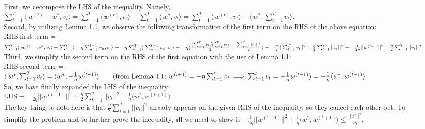 \documentclass[11pt,english]{article}
\begin{document}
	First, we decompose the LHS of the inequality. Namely, $\sum_{t=1}^{T} \langle\ w^{(t)} - w^*, v_t\rangle = \sum_{t=1}^{T} \langle\,w^{(t)}, v_t\rangle - \sum_{t=1}^{T} \langle\,w^*, v_t\rangle = \sum_{t=1}^{T} \langle\,w^{(t)}, v_t\rangle - \langle\,w^*, \sum_{t=1}^{T} v_t\rangle$.\\
	
	Second, by utilizing Lemma 1.1, we observe the following transformation of the first term on the RHS of the above equation:\\
	RHS first term = $\sum_{t=1}^{T} \langle\ w^{(t)} - w^*, v_t\rangle \\
	= \sum_{t=1}^{T} \langle\ -\eta \sum_{u=1}^{t-1} v_u, v_t\rangle \\
	= -\eta \sum_{t=1}^{T} \langle\ \sum_{u=1}^{t-1} v_u, v_t\rangle \\
	= -\eta (\frac{\langle \sum_{t=1}^{T} v_t, \sum_{t=1}^{T} v_t\rangle}{2} - \frac{\sum_{t=1}^{T} ||v_t||^2}{2})\\
	= -\frac{\eta}{2} ||\sum_{t=1}^{T} v_t||^2 + \frac{\eta}{2} \sum_{t=1}^{T} ||v_t||^2\\
	= -\frac{1}{2\eta} ||w^{(t+1)}||^2 + \frac{\eta}{2} \sum_{t=1}^{T} ||v_t||^2$\\

	Third, we simplify the second term on the RHS of the first equation with the use of Lemma 1.1:\\
	RHS second term = $\langle\,w^*, \sum_{t=1}^{T} v_t\rangle \\
	= \langle w^*, -\frac{1}{\eta} w^{(t+1)}\rangle \qquad (\text{from Lemma 1.1:} \thinspace\thinspace w^{(t+1)} = -\eta \sum_{i=1}^{t} v_t \implies \sum_{i=1}^{t} v_t = -\frac{1}{\eta} w^{(t+1)}) \\
	= -\frac{1}{\eta}\langle w^*, w^{(t+1)}\rangle$\\
	
	So, we have finally expanded the LHS of the inequality:\\
	LHS = $-\frac{1}{2\eta} ||w^{(t+1)}||^2 + \frac{\eta}{2} \sum_{t=1}^{T} ||v_t||^2 +\frac{1}{\eta}\langle w^*, w^{(t+1)}\rangle$ \\
	The key thing to note here is that $\frac{\eta}{2} \sum_{t=1}^{T} ||v_t||^2$ already appears on the given RHS of the inequality, so they cancel each other out. To simplify the problem and to further prove the inequality, all we need to show is $-\frac{1}{2\eta} ||w^{(t+1)}||^2 +\frac{1}{\eta}\langle w^*, w^{(t+1)}\rangle \leq \frac{||w^*||^2}{2\eta}$.\\
	
\end{document}
